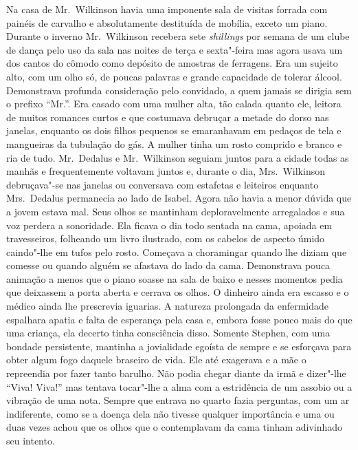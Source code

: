 Na casa de Mr.~Wilkinson havia uma imponente sala de visitas forrada com
painéis de carvalho e absolutamente destituída de mobília, exceto um piano.
Durante o inverno Mr.~Wilkinson recebera sete \textit{shillings} por semana de
um clube de dança pelo uso da sala nas noites de terça e sexta"-feira mas agora
usava um dos cantos do cômodo como depósito de amostras de ferragens.  Era um
sujeito alto, com um olho só, de poucas palavras e grande capacidade de tolerar
álcool.  Demonstrava profunda consideração pelo convidado, a quem jamais se
dirigia sem o prefixo \label{mr} “Mr.”.  Era casado com uma mulher alta, tão calada
quanto ele, leitora de muitos romances curtos e que costumava debruçar a metade
do dorso nas janelas, enquanto os dois filhos pequenos se emaranhavam em
\label{pedacos"-de} pedaços de tela e mangueiras da tubulação do gás.  A mulher tinha um rosto
comprido e branco e ria de tudo.  Mr.~Dedalus e Mr.~Wilkinson seguiam juntos
para a cidade todas as manhãs e frequentemente voltavam juntos e, durante o
dia, Mrs.~Wilkinson debruçava"-se nas janelas ou conversava com estafetas e
leiteiros enquanto Mrs.~Dedalus permanecia ao lado de Isabel.  Agora não havia
a menor dúvida que a jovem estava mal.  Seus olhos se mantinham deploravelmente
arregalados e sua voz perdera a sonoridade.  Ela ficava o dia todo sentada na
cama, apoiada em travesseiros, folheando um livro ilustrado, com os cabelos de
aspecto úmido caindo"-lhe em tufos pelo rosto.  Começava a choramingar quando
lhe diziam que comesse ou quando alguém se afastava do lado da cama.
Demonstrava pouca animação a menos que o piano soasse na sala de baixo e nesses
momentos pedia que deixassem a porta aberta e cerrava os olhos.  O dinheiro
ainda era escasso e o médico ainda lhe prescrevia iguarias.  A natureza
prolongada da enfermidade espalhara apatia e falta de esperança pela casa e,
embora fosse pouco mais do que uma criança, ela decerto tinha consciência
disso.  Somente Stephen, com uma bondade persistente, mantinha a jovialidade
egoísta de sempre e \label{se"-esforcava} se esforçava para obter algum fogo daquele braseiro de
vida.  Ele até exagerava e a mãe o repreendia por fazer tanto barulho.  Não
podia chegar diante da irmã e dizer"-lhe “Viva!  Viva!” mas tentava tocar"-lhe a
alma com a estridência de um assobio ou a vibração de uma nota.  Sempre que
entrava no quarto fazia perguntas, com um ar indiferente, como se a doença dela
não tivesse qualquer importância e uma ou duas vezes achou que os olhos que o
contemplavam da cama tinham adivinhado seu intento.


